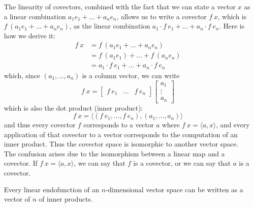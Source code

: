 The linearity of covectors, combined with the fact that
we can state a vector $x$ as a linear combination $a_1 e_1 + \ldots + a_n e_n$,
allows us to write a covector $f~x$, which is
$f~(a_1 e_1 + \ldots + a_n e_n)$,
as the linear combination
$a_1 \cdot f~e_1 + \ldots + a_n \cdot f~e_n$.
Here is how we derive it:
\begin{align*}
f~x &= f~(a_1 e_1 + \ldots + a_n e_n)
\\ &= f~(a_1 e_1) + \ldots + f~(a_n e_n)
\\ &= a_1 \cdot f~e_1 + \ldots + a_n \cdot f~e_n
\end{align*}
which, since $(a_1, \ldots, a_n)$ is a column vector, we can write
\[
f~x =
\begin{bmatrix}
f~e_1 & \ldots & f~e_n
\end{bmatrix}
\begin{bmatrix}
a_1 \\ \vdots \\ a_n
\end{bmatrix}
\]
which is also the dot product (inner product):
\[
f~x = \langle (f~e_1, \ldots, f~e_n), (a_1, \ldots, a_n) \rangle
\]
and thus every covector $f$ corresponds to a vector
$a$ where $f~x = \langle a, x \rangle$,
and every application of that covector to a vector
corresponds to the computation of an inner product.
Thus the covector space is isomorphic to another vector space.
The confusion arises due to the isomorphism between a linear map and a covector.
If $f~x = \langle a, x \rangle$,
we can say that $f$ is a covector, or we can say that $a$ is a covector.

Every linear endofunction of an $n$-dimensional vector space can be written as a vector of $n$ of inner products.

